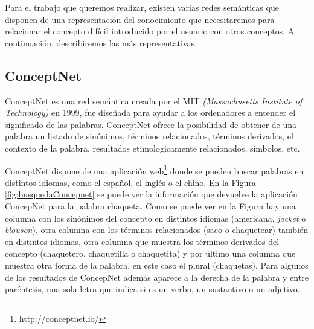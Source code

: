 Para el trabajo que queremos realizar, existen varias redes semánticas que disponen de una representación del conocimiento que necesitaremos para relacionar el concepto difícil introducido por el usuario con otros conceptos. A continuación, describiremos las más representativas.

\subsection{ConceptNet} 
\label{cap:subsec:concepnet}

ConceptNet es una red semántica creada por el MIT \textit{(Massachusetts Institute of Technology)} en 1999, fue diseñada para ayudar a los ordenadores a entender el significado de las palabras. ConceptNet ofrece la posibilidad de obtener de una palabra un listado de sinónimos, términos relacionados, términos derivados, el contexto de la palabra, resultados etimologicamente relacionados, símbolos, etc. 

ConceptNet dispone de una aplicación web\footnote{http://conceptnet.io/} donde se pueden buscar palabras en distintos idiomas,  como el español, el inglés o el chino.
En la Figura \ref{fig:busquedaConcepnet} se puede ver la información que devuelve la aplicación ConcepNet para la palabra chaqueta. Como se puede ver en la Figura hay una columna con los sinónimos del concepto  en distintos idiomas (americana, \textit{jacket} o \textit{blouson}), otra columna con los términos relacionados (saco o chaquetear) también en distintos idiomas, otra columna que muestra los términos derivados del concepto (chaquetero, chaquetilla o chaquetita) y por último una columna que muestra otra forma de la palabra, en este caso el plural (chaquetas).  Para algunos de los resultados de ConcepNet además aparece a la derecha de la palabra y entre paréntesis, una sola letra que indica si es un verbo, un sustantivo o un adjetivo. 

